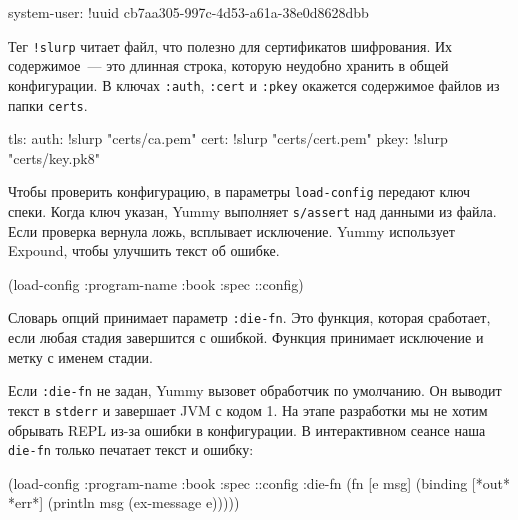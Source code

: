 \else

\begin{english}
  \begin{yaml}
system-user: !uuid cb7aa305-997c-4d53-a61a-38e0d8628dbb
  \end{yaml}
\end{english}

\fi

Тег \verb|!slurp| читает файл, что полезно для сертификатов шифрования. Их
содержимое~--- это длинная строка, которую неудобно хранить в общей конфигурации. В
ключах \verb|:auth|, \verb|:cert| и \verb|:pkey| окажется содержимое
файлов из папки \verb|certs|.

\begin{english}
  \begin{yaml}
tls:
  auth: !slurp "certs/ca.pem"
  cert: !slurp "certs/cert.pem"
  pkey: !slurp "certs/key.pk8"
  \end{yaml}
\end{english}


Чтобы проверить конфигурацию, в параметры \verb|load-config| передают ключ
спеки. Когда ключ указан, Yummy выполняет \verb|s/assert| над данными из
файла. Если проверка вернула ложь, всплывает исключение. Yummy использует
Expound, чтобы улучшить текст об ошибке.

\begin{english}
  \begin{clojure}
(load-config {:program-name :book
              :spec ::config})
  \end{clojure}
\end{english}


Словарь опций принимает параметр \verb|:die-fn|. Это функция, которая
сработает, если любая стадия завершится с ошибкой. Функция принимает исключение
и метку с именем стадии.


Если \verb|:die-fn| не задан, Yummy вызовет обработчик по умолчанию. Он
выводит текст в \verb|stderr| и завершает JVM с кодом 1. На этапе разработки
мы не хотим обрывать REPL из-за ошибки в конфигурации. В интерактивном сеансе
наша \verb|die-fn| только печатает текст и ошибку:

\ifx\devicetype\mobile

\begin{english}
  \begin{clojure}
(load-config
 {:program-name :book
  :spec ::config
  :die-fn (fn [e msg]
            (binding [*out* *err*]
              (println msg
                (ex-message e))))})
  \end{clojure}
\end{english}

